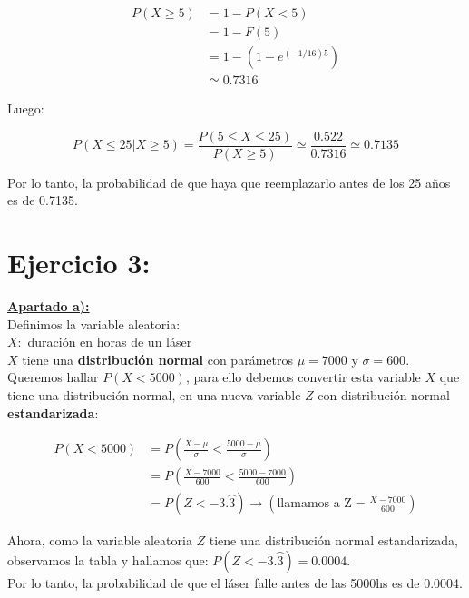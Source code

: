 \documentclass[11pt]{article}
\begin{document}
\begin{align*}
  P(X \geq 5) &= 1 - P(X < 5) \\
              &= 1 - F(5) \\
              &= 1 - (1- e^{(-1/16)5}) \\
              &\simeq 0.7316
\end{align*}

Luego:

\begin{equation*}
  P(X \leq 25 | X \geq 5) = \frac{P(5 \leq X \leq 25)}{P(X \geq 5)} 
                          \simeq \frac{0.522}{0.7316} 
                          \simeq 0.7135
\end{equation*}

Por lo tanto, la probabilidad de que haya que reemplazarlo antes de los 25 años
es de 0.7135. 

\section*{Ejercicio 3:}
\textbf{\underline{Apartado a):}} \\

Definimos la variable aleatoria: \\

$X:$ duración en horas de un láser \\

$ X $ tiene una \textbf{distribución normal} con parámetros $ \mu = 7000 $ y 
$ \sigma = 600 $. Queremos hallar $ P(X < 5000) $, para ello debemos convertir 
esta variable $ X $ que tiene una distribución normal, en una nueva variable $ Z $
con distribución normal \textbf{estandarizada}:

\begin{align*}
  P(X < 5000) &= P(\frac{X - \mu}{\sigma} < \frac{5000 - \mu}{\sigma}) \\
              &= P(\frac{X - 7000}{600} < \frac{5000 - 7000}{600})     \\
              &= P(Z < -3.\wideparen{3}) \rightarrow (\text{llamamos a Z} = \frac{X - 7000}{600})
\end{align*}

Ahora, como la variable aleatoria $ Z $ tiene una distribución normal estandarizada,
observamos la tabla y hallamos que: $ P(Z < -3.\wideparen{3}) = 0.0004 $. \\

Por lo tanto, la probabilidad de que el láser falle antes de las 5000hs es de 0.0004. \\
\end{document}
